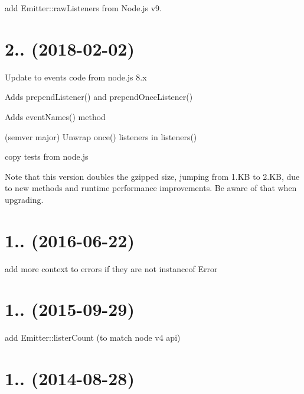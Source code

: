 
\begin{DoxyItemize}
\item add Emitter\+::raw\+Listeners from Node.\+js v9.
\end{DoxyItemize}

\section*{2.. (2018-\/02-\/02)}


\begin{DoxyItemize}
\item Update to events code from node.\+js 8.\+x
\begin{DoxyItemize}
\item Adds {\ttfamily prepend\+Listener()} and {\ttfamily prepend\+Once\+Listener()}
\item Adds {\ttfamily event\+Names()} method
\item (semver major) Unwrap {\ttfamily once()} listeners in {\ttfamily listeners()}
\end{DoxyItemize}
\item copy tests from node.\+js
\end{DoxyItemize}

Note that this version doubles the gzipped size, jumping from 1.\+KB to 2.\+KB, due to new methods and runtime performance improvements. Be aware of that when upgrading.

\section*{1.. (2016-\/06-\/22)}


\begin{DoxyItemize}
\item add more context to errors if they are not instanceof Error
\end{DoxyItemize}

\section*{1.. (2015-\/09-\/29)}


\begin{DoxyItemize}
\item add Emitter\+::lister\+Count (to match node v4 api)
\end{DoxyItemize}

\section*{1.. (2014-\/08-\/28)}


